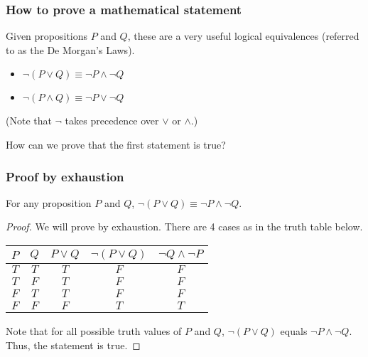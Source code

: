 

\begin{frame}\frametitle{How to prove a mathematical statement}
  Given propositions $P$ and $Q$, these are a very useful logical
  equivalences (referred to as the De Morgan's Laws).

  \begin{itemize}
  \item $\neg (P\vee Q)\equiv \neg P \wedge \neg Q$
  \item $\neg (P\wedge Q)\equiv \neg P \vee \neg Q$
  \end{itemize}

  (Note that $\neg$ takes precedence over $\vee$ or $\wedge$.)

  \vspace{0.2in}
  
  How can we prove that the first statement is true?
\end{frame}

\begin{frame}\frametitle{Proof by exhaustion}
  \begin{tcolorbox}
    For any proposition $P$ and $Q$, $\neg (P\vee Q)\equiv \neg P
    \wedge \neg Q$.
  \end{tcolorbox}
  \begin{proof}
    We will prove by exhaustion.  There are 4 cases as in the truth
    table below.

    \vspace{0.1in}
    
    \begin{tabular}{|c|c||c|c|c|}
      \hline
      $P$ & $Q$ & $P\vee Q$ & $\neg(P\vee Q)$ & $\neg Q \wedge \neg P$ \\
      \hline
      $T$ & $T$ & $T$ & $F$ & $F$ \\
      $T$ & $F$ & $T$ & $F$ & $F$ \\
      $F$ & $T$ & $T$ & $F$ & $F$ \\
      $F$ & $F$ & $F$ & $T$ & $T$ \\
      \hline
    \end{tabular}

    \vspace{0.1in}

    Note that for all possible truth values of $P$ and $Q$, $\neg
    (P\vee Q)$ equals $\neg P \wedge \neg Q$.  Thus, the statement is
    true.
  \end{proof}
\end{frame}
